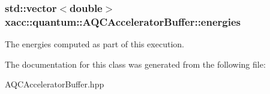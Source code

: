 \subsubsection[{\texorpdfstring{energies}{energies}}]{\setlength{\rightskip}{0pt plus 5cm}std\+::vector$<$double$>$ xacc\+::quantum\+::\+A\+Q\+C\+Accelerator\+Buffer\+::energies\hspace{0.3cm}{\ttfamily [protected]}}\hypertarget{a00016_abe6d781724e197df449d8dfcde60e1a4}{}\label{a00016_abe6d781724e197df449d8dfcde60e1a4}
The energies computed as part of this execution. 

The documentation for this class was generated from the following file\+:\begin{DoxyCompactItemize}
\item 
A\+Q\+C\+Accelerator\+Buffer.\+hpp\end{DoxyCompactItemize}
